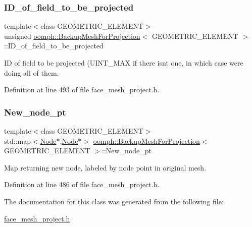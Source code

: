 \subsubsection{\texorpdfstring{I\+D\+\_\+of\+\_\+field\+\_\+to\+\_\+be\+\_\+projected}{ID\_of\_field\_to\_be\_projected}}
{\footnotesize\ttfamily template$<$class G\+E\+O\+M\+E\+T\+R\+I\+C\+\_\+\+E\+L\+E\+M\+E\+NT$>$ \\
unsigned \hyperlink{classoomph_1_1BackupMeshForProjection}{oomph\+::\+Backup\+Mesh\+For\+Projection}$<$ G\+E\+O\+M\+E\+T\+R\+I\+C\+\_\+\+E\+L\+E\+M\+E\+NT $>$\+::I\+D\+\_\+of\+\_\+field\+\_\+to\+\_\+be\+\_\+projected\hspace{0.3cm}{\ttfamily [private]}}



ID of field to be projected (U\+I\+N\+T\+\_\+\+M\+AX if there isn\textquotesingle{}t one, in which case we\textquotesingle{}re doing all of them. 



Definition at line 493 of file face\+\_\+mesh\+\_\+project.\+h.

\mbox{\label{classoomph_1_1BackupMeshForProjection_ae921b83792e20e1a5d974e1e89be6489}} 
\subsubsection{\texorpdfstring{New\+\_\+node\+\_\+pt}{New\_node\_pt}}
{\footnotesize\ttfamily template$<$class G\+E\+O\+M\+E\+T\+R\+I\+C\+\_\+\+E\+L\+E\+M\+E\+NT$>$ \\
std\+::map$<$\hyperlink{classoomph_1_1Node}{Node}$\ast$,\hyperlink{classoomph_1_1Node}{Node}$\ast$$>$ \hyperlink{classoomph_1_1BackupMeshForProjection}{oomph\+::\+Backup\+Mesh\+For\+Projection}$<$ G\+E\+O\+M\+E\+T\+R\+I\+C\+\_\+\+E\+L\+E\+M\+E\+NT $>$\+::New\+\_\+node\+\_\+pt\hspace{0.3cm}{\ttfamily [private]}}



Map returning new node, labeled by node point in original mesh. 



Definition at line 486 of file face\+\_\+mesh\+\_\+project.\+h.



The documentation for this class was generated from the following file\+:\begin{DoxyCompactItemize}
\item 
\hyperlink{face__mesh__project_8h}{face\+\_\+mesh\+\_\+project.\+h}\end{DoxyCompactItemize}
